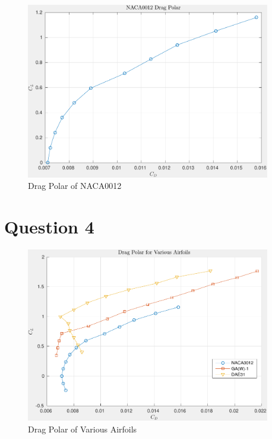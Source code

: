 \documentclass[letterpaper,12pt,]{article}
\begin{document}
\begin{figure}[!h]
    \centering
    \includegraphics[width = 0.95\textwidth]{./figures/q3dp.pdf}
    \caption{Drag Polar of NACA0012}
    \label{fig:q3dp}
\end{figure}

\section*{Question 4}

\begin{figure}[!h]
    \centering
    \includegraphics[width = 0.95\textwidth]{./figures/q4dp.pdf}
    \caption{Drag Polar of Various Airfoils}
    \label{fig:q4a}
\end{figure}
\end{document}
